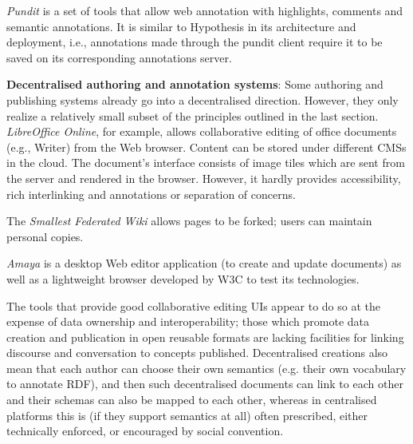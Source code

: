 \documentclass[a4paper]{llncs}
\begin{document}
                                \textit{Pundit} is a set of tools that allow web annotation with highlights, comments and semantic annotations. It is similar to Hypothesis in its architecture and deployment, i.e., annotations made through the pundit client require it to be saved on its corresponding annotations server.




                            

                            
\par 
                                \textbf{Decentralised authoring and annotation systems}:
                                Some authoring and publishing systems already go into a decentralised direction. However, they only realize a relatively small subset of the principles outlined in the last section. \textit{LibreOffice Online}, for example, allows collaborative editing of office documents (e.g., Writer) from the Web browser. Content can be stored under different CMSs in the cloud. The document’s interface consists of image tiles which are sent from the server and rendered in the browser. However, it hardly provides accessibility, rich interlinking and annotations or separation of concerns.

                                The \textit{Smallest Federated Wiki} allows pages to be forked; users can maintain personal copies.

                                

                                \textit{Amaya} is a desktop Web editor application (to create and update documents) as well as a lightweight browser developed by W3C to test its technologies.
                            

                            
\par The tools that provide good collaborative editing UIs appear to do so at the expense of data ownership and interoperability; those which promote data creation and publication in open reusable formats are lacking facilities for linking discourse and conversation to concepts published. Decentralised creations also mean that each author can choose their own semantics (e.g. their own vocabulary to annotate RDF), and then such decentralised documents can link to each other and their schemas can also be mapped to each other, whereas in centralised platforms this is (if they support semantics at all) often prescribed, either technically enforced, or encouraged by social convention.
                        
\end{document}
